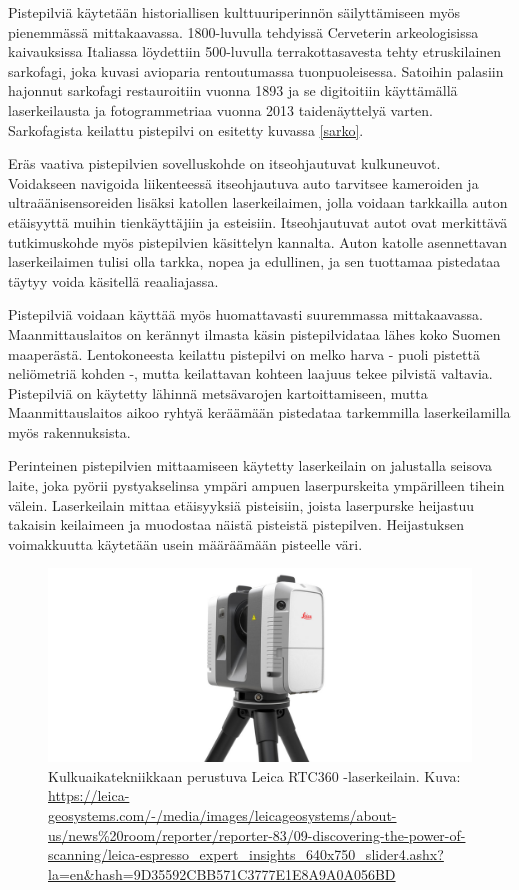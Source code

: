 Pistepilviä käytetään historiallisen kulttuuriperinnön säilyttämiseen myös pienemmässä mittakaavassa. 1800-luvulla tehdyissä Cerveterin arkeologisissa kaivauksissa Italiassa löydettiin 500-luvulla terrakottasavesta tehty etruskilainen sarkofagi, joka kuvasi avioparia rentoutumassa tuonpuoleisessa. Satoihin palasiin hajonnut sarkofagi restauroitiin vuonna 1893 ja se digitoitiin käyttämällä laserkeilausta ja fotogrammetriaa vuonna 2013 taidenäyttelyä varten. Sarkofagista keilattu pistepilvi on esitetty kuvassa \ref{sarko}. \cite{sarkofagi} 

Eräs vaativa pistepilvien sovelluskohde on itseohjautuvat kulkuneuvot. Voidakseen navigoida liikenteessä itseohjautuva auto tarvitsee kameroiden ja ultraäänisensoreiden lisäksi katollen laserkeilaimen, jolla voidaan tarkkailla auton etäisyyttä muihin tienkäyttäjiin ja esteisiin. Itseohjautuvat autot ovat merkittävä tutkimuskohde myös pistepilvien käsittelyn kannalta. Auton katolle asennettavan laserkeilaimen tulisi olla tarkka, nopea ja edullinen, ja sen tuottamaa pistedataa täytyy voida käsitellä reaaliajassa. \cite{car} 

Pistepilviä voidaan käyttää myös huomattavasti suuremmassa mittakaavassa. Maanmittauslaitos on kerännyt ilmasta käsin pistepilvidataa lähes koko Suomen maaperästä. Lentokoneesta keilattu pistepilvi on melko harva - puoli pistettä neliömetriä kohden -, mutta keilattavan kohteen laajuus tekee pilvistä valtavia. Pistepilviä on käytetty lähinnä metsävarojen kartoittamiseen, mutta Maanmittauslaitos aikoo ryhtyä keräämään pistedataa tarkemmilla laserkeilamilla myös rakennuksista. \cite{hs}

Perinteinen pistepilvien mittaamiseen käytetty laserkeilain on jalustalla seisova laite, joka pyörii pystyakselinsa ympäri ampuen laserpurskeita ympärilleen tihein välein. Laserkeilain mittaa etäisyyksiä pisteisiin, joista laserpurske heijastuu takaisin keilaimeen ja muodostaa näistä pisteistä pistepilven. Heijastuksen voimakkuutta käytetään usein määräämään pisteelle väri. 

\begin{figure}
    \centering
    \includegraphics[width=0.7\paperwidth]{img/leica.jpg}
    \caption{Kulkuaikatekniikkaan perustuva Leica RTC360 -laserkeilain. Kuva: \url{https://leica-geosystems.com/-/media/images/leicageosystems/about-us/news\%20room/reporter/reporter-83/09-discovering-the-power-of-scanning/leica-espresso_expert_insights_640x750_slider4.ashx?la=en&hash=9D35592CBB571C3777E1E8A9A0A056BD}}
    \label{leica}
\end{figure}

